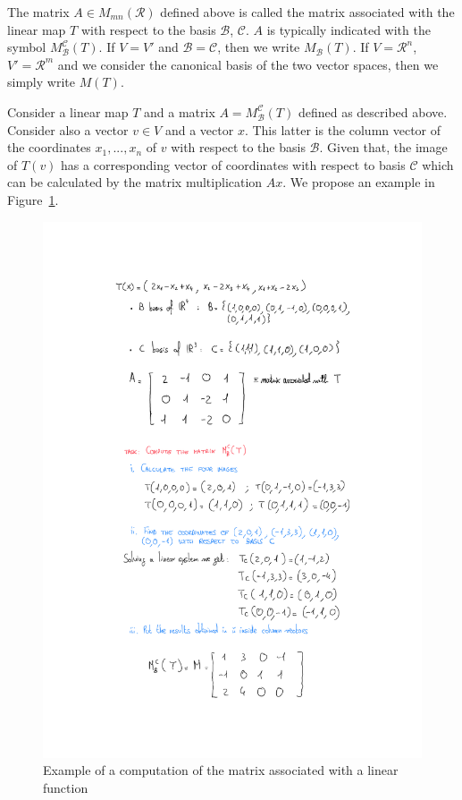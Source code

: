 The matrix $A \in M_{mn}(\mathcal{R})$ defined above is called the matrix associated with the linear map $T$ with respect to the basis $\mathcal{B}$, $\mathcal{C}$. $A$ is typically indicated with the symbol $M^\mathcal{C}_\mathcal{B}(T)$. If $V=V'$ and $\mathcal{B}=\mathcal{C}$, then we write $M_\mathcal{B}(T)$. If $V=\mathcal{R}^n$, $V'=\mathcal{R}^m$ and we consider the canonical basis of the two vector spaces, then we simply write $M(T)$.


Consider a linear map $T$ and a matrix $A=M^\mathcal{C}_\mathcal{B}(T)$ defined as described above. Consider also a vector $v \in V$ and a vector $x$. This latter is the column vector of the coordinates $x_1,...,x_n$ of $v$ with respect to the basis $\mathcal{B}$. Given that, the image of $T(v)$ has a corresponding vector of coordinates with respect to basis $\mathcal{C}$ which can be calculated by the matrix multiplication $Ax$. We propose an example in Figure~\ref{fig:linear_function_matrix}.
\begin{figure}
    \centering
    \includegraphics[scale=0.5]{images/Esempio matrice associata a una funzione lineare.pdf}
    \caption{Example of a computation of the matrix associated with a linear function}
    \label{fig:linear_function_matrix}
\end{figure}

